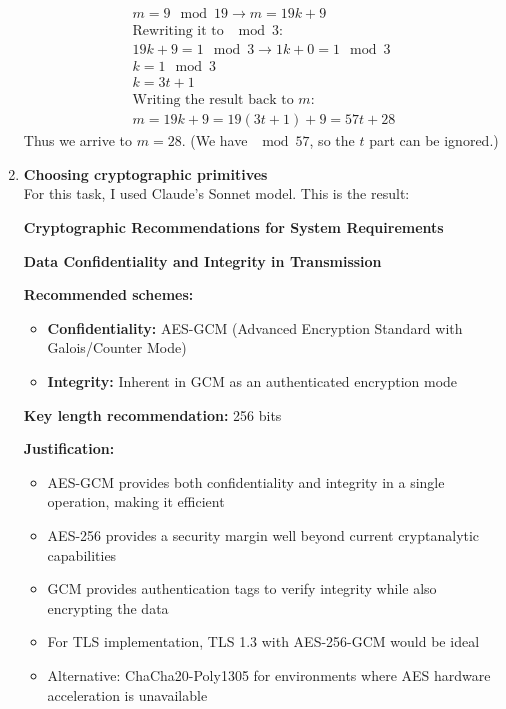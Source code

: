 \documentclass{article}
\begin{document}
\begin{enumerate}[label=\textbf{Task \arabic*:}]
\begin{gather*}
			m = 9 \mod 19 \rightarrow m = 19k + 9 \\
			\text{Rewriting it to $\mod 3$:} \\
			19k + 9 = 1 \mod 3 \rightarrow 1k + 0 = 1 \mod 3 \\
			k = 1 \mod 3 \\
			k = 3t + 1 \\
			\text{Writing the result back to $m$:} \\
			m = 19k + 9 = 19(3t + 1) + 9 = 57t + 28
		\end{gather*}
		Thus we arrive to $m = 28$. (We have $\mod 57$, so the $t$ part can be ignored.)
		\item \textbf{Choosing cryptographic primitives}\\
		For this task, I used Claude's Sonnet model.\cite{claude3} This is the result:\\
		\begin{tcolorbox}[ 
			breakable,
			before skip=0pt,           %
			after skip=12pt,            %
			break at=\textheight       %
			]
		\noindent\textbf{\Large Cryptographic Recommendations for System Requirements}
		
		\bigskip
		\noindent\textbf{\large Data Confidentiality and Integrity in Transmission}
		
		\noindent\textbf{Recommended schemes:}
		\begin{itemize}
			\item \textbf{Confidentiality:} AES-GCM (Advanced Encryption Standard with Galois/Counter Mode)
			\item \textbf{Integrity:} Inherent in GCM as an authenticated encryption mode
		\end{itemize}
		
		\noindent\textbf{Key length recommendation:} 256 bits
		
		\noindent\textbf{Justification:}
		\begin{itemize}
			\item AES-GCM provides both confidentiality and integrity in a single operation, making it efficient
			\item AES-256 provides a security margin well beyond current cryptanalytic capabilities
			\item GCM provides authentication tags to verify integrity while also encrypting the data
			\item For TLS implementation, TLS 1.3 with AES-256-GCM would be ideal
			\item Alternative: ChaCha20-Poly1305 for environments where AES hardware acceleration is unavailable
		\end{itemize}
		

\end{tcolorbox}
\end{enumerate}
\end{document}
